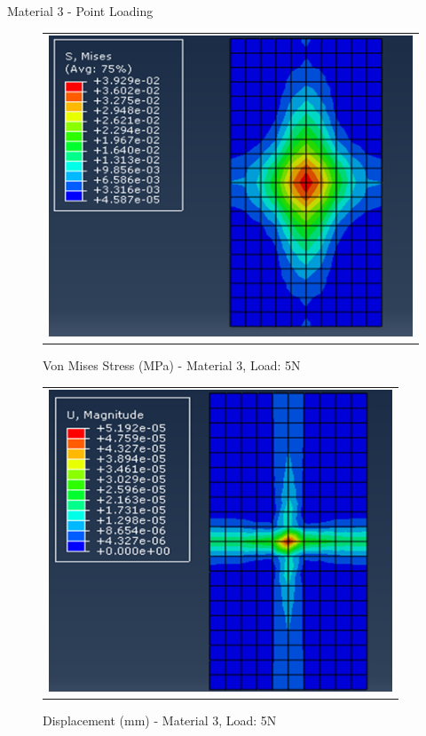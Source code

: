 \documentclass[a4paper,12pt]{article}
\numberwithin{equation}{section}
\numberwithin{figure}{section}
\begin{document}

\newpage
\noindent Material 3 - Point Loading 
\begin{figure}[H]
  \centering
  \begin{tabular}{@{}c@{}}
    \includegraphics[width=0.7\linewidth,height=255pt]{Results/Point Loading/M3_VMS_L1.png} \\
  \end{tabular}
  \caption{Von Mises Stress (MPa) - Material 3, Load: 5N}
\end{figure}

\begin{figure}[H]
  \centering
  \begin{tabular}{@{}c@{}}
    \includegraphics[width=0.7\linewidth,height=255pt]{Results/Point Loading/M3_DIS_L1.png} \\
  \end{tabular}
  \caption{Displacement (mm) - Material 3, Load: 5N}
\end{figure}
\end{document}
